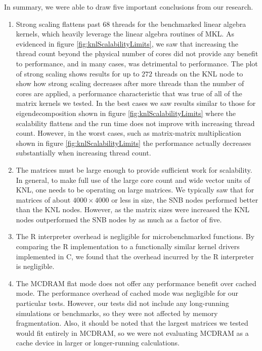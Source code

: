 In summary, we were able to draw five important conclusions from our research.
\begin{enumerate}
\item Strong scaling flattens past 68 threads for the benchmarked linear algebra kernels,
which heavily leverage the linear algebra routines of MKL. As evidenced in figure
\ref{fig:knlScalabilityLimits}, we saw that increasing the thread count beyond the
physical number of cores did not provide any benefit to performance, and in many cases,
was detrimental to performance. The plot of strong scaling shows results for up to $272$
threads on the KNL node to show how strong scaling decreases after more threads than the
number of cores are applied, a performance characteristic that was true of all of the
matrix kernels we tested. In the best cases we saw results similar to those for
eigendecomposition shown in figure \ref{fig:knlScalabilityLimits} where the scalability
flattens and the run time does not improve with increasing thread count. However, in the
worst cases, such as matrix-matrix multiplication shown in figure
\ref{fig:knlScalabilityLimits} the performance actually decreases substantially when
increasing thread count.

\item The matrices must be large enough to provide sufficient work for scalability. In
general, to make full use of the large core count and wide vector units of KNL, one needs
to be operating on large matrices. We typically saw that for matrices of about $4000\times
4000$ or less in size, the SNB nodes performed better than the KNL nodes. However, as the
matrix sizes were increased the KNL nodes outperformed the SNB nodes by as much as a
factor of five.

\item The R interpreter overhead is negligible for microbenchmarked functions. By
comparing the R implementation to a functionally similar kernel drivers implemented in C,
we found that the overhead incurred by the R interpreter is negligible.

\item The MCDRAM flat mode does not offer any performance benefit over cached mode. The
performance overhead of cached mode was negligible for our particular tests. However, our
tests did not include any long-running simulations or benchmarks, so they were not
affected by memory fragmentation. Also, it should be noted that the largest matrices we
tested would fit entirely in MCDRAM, so we were not evaluating MCDRAM as a cache device in
larger or longer-running calculations.


\end{enumerate}
